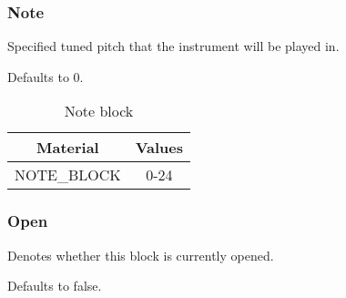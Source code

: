 \subsubsection{Note}
Specified tuned pitch that the instrument will be played in.

Defaults to 0.

\begin{table}[H]
	\centering
	\begin{tabular}{ |c|c| }
		\hline
		Material & Values \\
		\hline
		NOTE\_BLOCK & 0-24 \\
		\hline
	\end{tabular}
	\caption{Note block}
\end{table}

\subsubsection{Open}
Denotes whether this block is currently opened.

Defaults to false.

